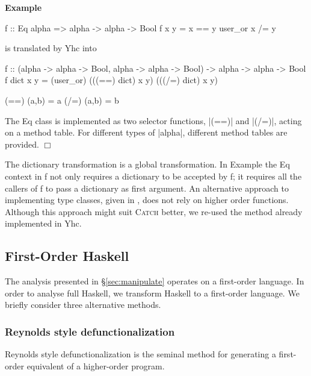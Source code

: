 \documentclass[preprint]{sigplanconf}
\newcommand{\C}[1]{\textsf{#1}}
\newcommand{\catch}{\textsc{Catch}}
\newcounter{exmp}
\newcommand{\yesexample}{\addtocounter{exmp}{1}\addvspace{2mm}\noindent\textbf{Example \arabic{exmp}}}
\newcommand{\noexample}{\hfill\ensuremath{\Box}\par\addvspace{2mm}}
\newcommand{\lastexample}{\arabic{exmp}}
\newenvironment{example}{\yesexample}{\noexample}
\begin{document}
\begin{example}
\nopagebreak
\begin{code}
f :: Eq alpha => alpha -> alpha -> Bool
f x y = x == y user_or x /= y
\end{code}

\noindent is translated by Yhc into

\begin{code}
f :: (alpha -> alpha -> Bool, alpha -> alpha -> Bool) -> alpha -> alpha -> Bool
f dict x y = (user_or) (((==) dict) x y) (((/=) dict) x y)

(==) (a,b) = a
(/=) (a,b) = b
\end{code}

The \C{Eq} class is implemented as two selector functions, |(==)| and |(/=)|, acting on a method table. For different types of |alpha|, different method tables are provided.
\end{example}

The dictionary transformation is a global transformation. In Example \lastexample{} the \C{Eq} context in \C{f} not only requires a dictionary to be accepted by \C{f}; it requires all the callers of \C{f} to pass a dictionary as first argument. An alternative approach to implementing type classes, given in \citet{jones:dictionary_free}, does not rely on higher order functions. Although this approach might suit \catch{} better, we re-used the method already implemented in Yhc.

\subsection{First-Order Haskell}

The analysis presented in \S\ref{sec:manipulate} operates on a first-order language. In order to analyse full Haskell, we transform Haskell to a first-order language. We briefly consider three alternative methods.

\subsubsection{Reynolds style defunctionalization}

Reynolds style defunctionalization \citep{reynolds:defunc} is the seminal method for generating a first-order equivalent of a higher-order program.
\end{document}
